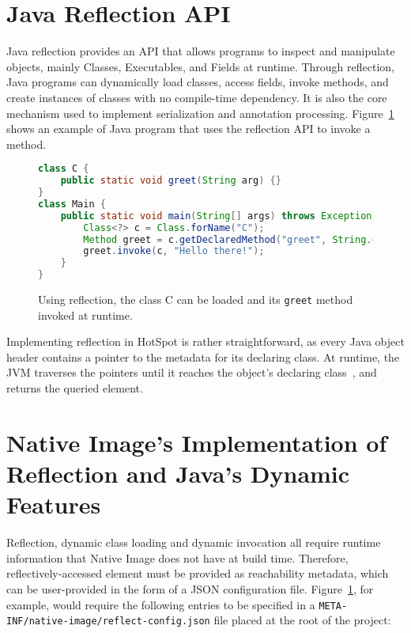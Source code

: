 \section{Java Reflection API}
Java reflection provides an API that allows programs to inspect and manipulate objects, mainly Classes, Executables, and Fields at runtime.
Through reflection, Java programs can dynamically load classes, access fields, invoke methods, and create instances of classes with no compile-time dependency. It is also the core mechanism used to implement serialization and annotation processing. Figure~\ref{fig:reflective_calls} shows an example of Java program that uses the reflection API to invoke a method.

\begin{figure}[ht]
    \centering
\begin{lstlisting}[language=Java]
class C {
    public static void greet(String arg) {}
}
class Main {
    public static void main(String[] args) throws Exception {
        Class<?> c = Class.forName("C");
        Method greet = c.getDeclaredMethod("greet", String.class);
        greet.invoke(c, "Hello there!");
    }
}
\end{lstlisting}
    \caption{Using reflection, the class C can be loaded and its \texttt{greet} method invoked at runtime.}
    \label{fig:reflective_calls}
\end{figure}

Implementing reflection in HotSpot is rather straightforward, as every Java object header contains a pointer to the metadata for its declaring class. At runtime, the JVM traverses the pointers until it reaches the object's declaring class~\cite{evans_ben_reflection_nodate}, and returns the queried element.



\section{Native Image's Implementation of Reflection and Java's Dynamic Features}
Reflection, dynamic class loading and dynamic invocation all require runtime information that Native Image does not have at build time. Therefore, reflectively-accessed element must be provided as reachability metadata, which can be user-provided in the form of a JSON configuration file.  
Figure~\ref{fig:reflective_calls}, for example, would require the following entries to be specified in a \verb|META-INF/native-image/reflect-config.json| file placed at the root of the project:

